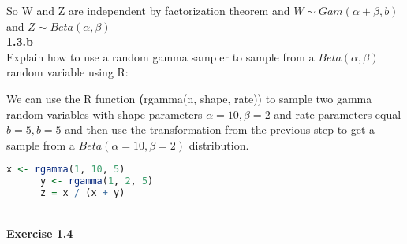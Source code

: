 \documentclass[12pt]{article}
\begin{document}
    So W and Z are independent by factorization theorem and \(W \sim Gam(\alpha + \beta, b)\) and
    \(Z \sim Beta(\alpha, \beta)\) \\

    \textbf{1.3.b} \\
    Explain how to use a random gamma sampler to sample from a \(Beta(\alpha, \beta)\) random variable
    using R:

    We can use the R function \textbf(rgamma(n, shape, rate)) to sample two gamma random variables
    with shape parameters \(\alpha = 10, \beta = 2\) and rate parameters equal \(b = 5, b= 5\) and then
    use the transformation from the previous step to get a sample from a \(Beta(\alpha = 10, \beta =2)\)
    distribution.

    \begin{lstlisting}[language=R]
      x <- rgamma(1, 10, 5)
      y <- rgamma(1, 2, 5)
      z = x / (x + y)
    \end{lstlisting} \\

    \noindent \textbf{Exercise 1.4}
\end{document}
